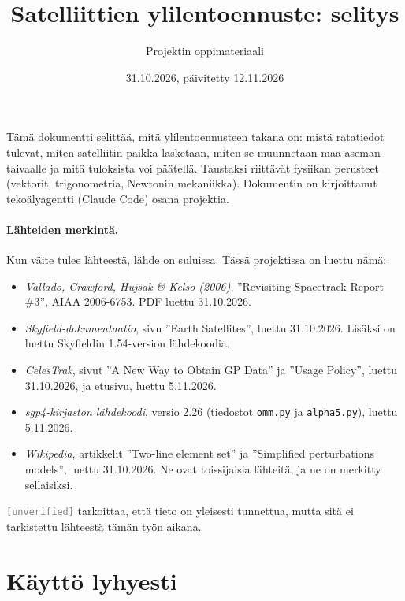 \documentclass[a4paper,11pt]{article}
\title{Satelliittien ylilentoennuste: selitys}
\author{Projektin \koodi{passplan} oppimateriaali}
\date{31.10.2026, päivitetty 12.11.2026}
\newcommand{\unverified}[1][]{\textcolor{gray}{\texttt{[unverified#1]}}}
\newcommand{\koodi}[1]{\texttt{#1}}
\begin{document}
\maketitle

Tämä dokumentti selittää, mitä ylilentoennusteen takana on: mistä ratatiedot tulevat, miten satelliitin paikka lasketaan, miten se muunnetaan maa-aseman taivaalle ja mitä tuloksista voi päätellä. Taustaksi riittävät fysiikan perusteet (vektorit, trigonometria, Newtonin mekaniikka). Dokumentin on kirjoittanut tekoälyagentti (Claude Code) osana projektia.

\paragraph{Lähteiden merkintä.} Kun väite tulee lähteestä, lähde on suluissa. Tässä projektissa on luettu nämä:
\begin{itemize}
  \item \emph{Vallado, Crawford, Hujsak \& Kelso (2006)}, ”Revisiting Spacetrack Report \#3”, AIAA 2006-6753. PDF luettu 31.10.2026.
  \item \emph{Skyfield-dokumentaatio}, sivu ”Earth Satellites”, luettu 31.10.2026. Lisäksi on luettu Skyfieldin 1.54-version lähdekoodia.
  \item \emph{CelesTrak}, sivut ”A New Way to Obtain GP Data” ja ”Usage Policy”, luettu 31.10.2026, ja etusivu, luettu 5.11.2026.
  \item \emph{sgp4-kirjaston lähdekoodi}, versio 2.26 (tiedostot \koodi{omm.py} ja \koodi{alpha5.py}), luettu 5.11.2026.
  \item \emph{Wikipedia}, artikkelit ”Two-line element set” ja ”Simplified perturbations models”, luettu 31.10.2026. Ne ovat toissijaisia lähteitä, ja ne on merkitty sellaisiksi.
\end{itemize}
\unverified{} tarkoittaa, että tieto on yleisesti tunnettua, mutta sitä ei tarkistettu lähteestä tämän työn aikana.

\tableofcontents

\section{Käyttö lyhyesti}\label{sec:kaytto}
\end{document}
